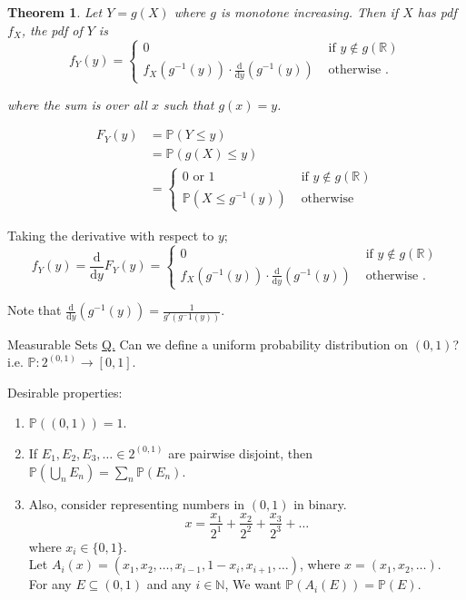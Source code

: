 \documentclass[a4paper,11pt]{amsbook}
\makeatletter
\def\section{\@startsection{section}{2}%
    \z@{1\linespacing\@plus1\linespacing}{.5\linespacing}%
    {\large\normalfont\bfseries\centering\color{darkblue}}}
\renewenvironment{proof}[1][\proofname]{\par
    \pushQED{\qed}%
    \normalfont \topsep6\p@\@plus6\p@\relax
    \trivlist
    \itemindent\z@ %
    \item[\hskip\labelsep
          \scshape
      #1\@addpunct{.}]\ignorespaces
}{%
    \popQED\endtrivlist\@endpefalse
}
\newtheorem{theorem}{\hspace{-2em} \color{darkblue} Theorem}[chapter]
\theoremstyle{definition}
\theoremstyle{remark}
\newcommand{\R}{\mathbb{R}}
\newcommand{\N}{\mathbb{N}}
\renewcommand{\P}{\mathbb{P}}
\newcommand\inc\subseteq
\newcommand\0{\varnothing}
\newcommand\diff[2][]
{
    \frac{\mathrm{d}#1}{\mathrm{d}#2}
}
\makeatother
\begin{document}
    \begin{theorem}
        Let $Y=g(X)$ where $g$ is monotone increasing. 
        Then if $X$ has pdf $f_X$, the pdf of $Y$ is $$f_Y(y)=\begin{cases}
            0 & \text{ if }y\notin g(\R) \\[5pt]
            f_X(g^{-1}(y))\cdot\diff{y}(g^{-1}(y)) & \text{ otherwise }.
        \end{cases}$$

        where the sum is over all $x$ such that $g(x)=y$.
    \end{theorem}
    \begin{proof}
        \begin{align*}
            F_Y(y)&=\P(Y\leq y) \\
            &=\P(g(X)\leq y) \\
            &=\begin{cases}
                0 \text{ or } 1 & \text{ if }y\notin g(\R) \\[5pt]
                \P(X\leq g^{-1}(y)) & \text{ otherwise }
            \end{cases}
        \end{align*}

        Taking the derivative with respect to $y$;
        $$f_Y(y)=\diff{y}F_Y(y)=\begin{cases}
            0 & \text{ if }y\notin g(\R) \\[5pt]
            f_X(g^{-1}(y))\cdot\diff{y}(g^{-1}(y)) & \text{ otherwise }.
        \end{cases}$$

        Note that $\diff{y}(g^{-1}(y))=\frac{1}{g'(g^-1(y))}.$
    \end{proof}

    \section{Measurable Sets}
    \underline{Q.} Can we define a uniform probability distribution on $(0,1)$?
    i.e. $\P:2^{(0,1)}\to[0,1]$.

    Desirable properties: \begin{enumerate}[label=(\arabic*)]
        \item $\P((0,1))=1$.
        \item If $E_1,E_2,E_3,\ldots\in2^{(0,1)}$ are pairwise disjoint, 
        then $\P\left(\bigcup_n E_n\right)=\sum_n\P(E_n)$.
        \item Also, consider representing numbers in $(0,1)$ in binary.\\
        $$x=\frac{x_1}{2^1}+\frac{x_2}{2^2}+\frac{x_3}{2^3}+\ldots$$
        where $x_i\in\{0,1\}$.\\
        Let $A_i(x)=(x_1,x_2,\ldots,x_{i-1},1-x_i,x_{i+1},\ldots)$,
        where $x=(x_1,x_2,\ldots)$.\\
        For any $E\inc(0,1)$ and any $i\in\N$, We want $\P(A_i(E))=\P(E)$.
    \end{enumerate}
\end{document}
